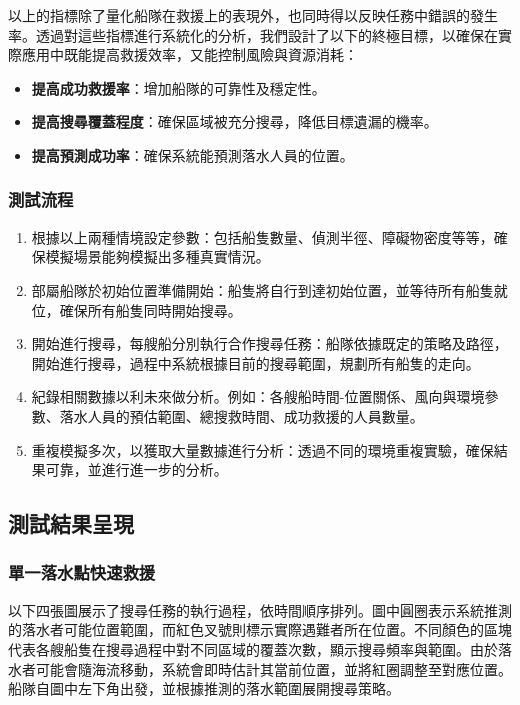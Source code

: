 \documentclass[12pt,a4paper]{article}
\begin{document}
以上的指標除了量化船隊在救援上的表現外，也同時得以反映任務中錯誤的發生率。透過對這些指標進行系統化的分析，我們設計了以下的終極目標，以確保在實際應用中既能提高救援效率，又能控制風險與資源消耗：
\begin{itemize}
    \item \textbf{提高成功救援率}：增加船隊的可靠性及穩定性。
    \item \textbf{提高搜尋覆蓋程度}：確保區域被充分搜尋，降低目標遺漏的機率。
    \item \textbf{提高預測成功率}：確保系統能預測落水人員的位置。
\end{itemize}

\subsubsection{測試流程}
\begin{enumerate}
    \item 根據以上兩種情境設定參數：包括船隻數量、偵測半徑、障礙物密度等等，確保模擬場景能夠模擬出多種真實情況。
    \item 部屬船隊於初始位置準備開始：船隻將自行到達初始位置，並等待所有船隻就位，確保所有船隻同時開始搜尋。
    \item 開始進行搜尋，每艘船分別執行合作搜尋任務：船隊依據既定的策略及路徑，開始進行搜尋，過程中系統根據目前的搜尋範圍，規劃所有船隻的走向。
    \item 紀錄相關數據以利未來做分析。例如：各艘船時間-位置關係、風向與環境參數、落水人員的預估範圍、總搜救時間、成功救援的人員數量。
    \item 重複模擬多次，以獲取大量數據進行分析：透過不同的環境重複實驗，確保結果可靠，並進行進一步的分析。
\end{enumerate}

\newpage

\subsection{測試結果呈現}
\subsubsection{單一落水點快速救援}

以下四張圖展示了搜尋任務的執行過程，依時間順序排列。圖中圓圈表示系統推測的落水者可能位置範圍，而紅色叉號則標示實際遇難者所在位置。不同顏色的區塊代表各艘船隻在搜尋過程中對不同區域的覆蓋次數，顯示搜尋頻率與範圍。由於落水者可能會隨海流移動，系統會即時估計其當前位置，並將紅圈調整至對應位置。船隊自圖中左下角出發，並根據推測的落水範圍展開搜尋策略。
\end{document}
